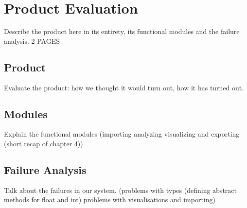 \chapter{Product Evaluation} %

Describe the product here in its entirety, its functional modules and the failure analysis. 2 PAGES

\section{Product}
Evaluate the product: how we thought it would turn out, how it has turned out.

\section{Modules}
Explain the functional modules (importing analyzing visualizing and exporting (short recap of chapter 4))

\section{Failure Analysis}
Talk about the failures in our system. (problems with types (defining abstract methods for float and int) problems with visualisations and importing)